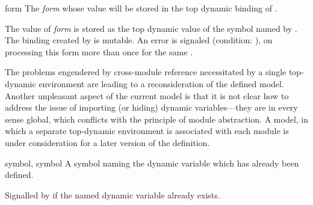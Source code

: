 \begin{optDefinition}
\begin{arguments}
    \item[form] The {\em form} whose value will be stored in the top dynamic
    binding of .
\end{arguments}
%
\remarks%
The value of {\em form} is stored as the top dynamic value of the symbol named
by  .  The binding created by
 is mutable.  An error is signaled (condition:
), on processing this form more than
once for the same .
%
\begin{note}
    The problems engendered by cross-module reference necessitated by a single
    top-dynamic environment are leading to a reconsideration of the defined
    model.  Another unpleasant aspect of the current model is that it is not
    clear how to address the issue of importing (or hiding) dynamic
    variables---they are in every sense global, which conflicts with the
    principle of module abstraction.  A model, in which a separate top-dynamic
    environment is associated with each module is under consideration for a
    later version of the definition.
\end{note}

%
\begin{initoptions}
    \item[symbol, symbol] A symbol naming the dynamic variable which has already
    been defined.
\end{initoptions}
%
\remarks%
Signalled by  if the named dynamic variable already
exists.
\end{optDefinition}

